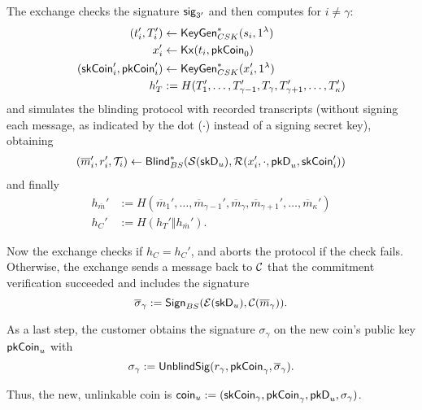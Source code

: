 \begin{itemize}
    The exchange checks the signature $\mathsf{sig}_{3'}$ and then computes for $i \ne \gamma$:
    \begin{align*}
      (t_i', T_i') &\leftarrow \mathsf{KeyGen}^*_{CSK}(s_i, 1^\lambda)\\
      x_i' &\leftarrow \mathsf{Kx}(t_i, \mathsf{pkCoin}_0)\\
      (\mathsf{skCoin}_i', \mathsf{pkCoin}_i') &\leftarrow
              \mathsf{KeyGen}^*_{CSK}(x_i', 1^\lambda) \\
      h_T' &:= H(T'_1, \dots, T_{\gamma-1}', T_\gamma, T_{\gamma+1}', \dots, T_\kappa')
    \end{align*}
    and simulates the blinding protocol with recorded transcripts (without signing each message,
    as indicated by the dot ($\cdot$) instead of a signing secret key), obtaining
    \begin{align*}
      (\overline{m}_i', r_i', \mathcal{T}_i) &\leftarrow
          \mathsf{Blind}^*_{BS}(\mathcal{S}(\mathsf{skD}_u), \mathcal{R}(x_i', \cdot, \mathsf{pkD}_u, \mathsf{skCoin}'_i))\\
    \end{align*}
    and finally
    \begin{align*}
      h_{\overline{m}}' &:= H(\overline{m}_1', \dots, \overline{m}_{\gamma-1}', \overline{m}_\gamma, \overline{m}_{\gamma+1}',\dots, \overline{m}_\kappa')\\
      h_C' &:= H(h_T' \Vert h_{\overline{m}}').
    \end{align*}

    Now the exchange checks if $h_C = h_C'$, and aborts the protocol if the check fails.
    Otherwise, the exchange sends a message back to $\mathcal{C}$ that the commitment verification succeeded and includes
    the signature
    \begin{equation*}
      \overline{\sigma}_\gamma := \mathsf{Sign}_{BS}(\mathcal{E}(\mathsf{skD}_u), \mathcal{C}(\overline{m}_\gamma)).
    \end{equation*}

    As a last step, the customer obtains the signature $\sigma_\gamma$ on the new coin's public key $\mathsf{pkCoin}_u$ with
    \begin{equation*}
      \sigma_\gamma := \mathsf{UnblindSig}(r_\gamma, \mathsf{pkCoin}_\gamma, \overline{\sigma}_\gamma).
    \end{equation*}

    Thus, the new, unlinkable coin is $\mathsf{coin}_u := (\mathsf{skCoin}_\gamma, \mathsf{pkCoin}_\gamma, \mathsf{pkD}_u, \sigma_\gamma)$.


\end{itemize}
